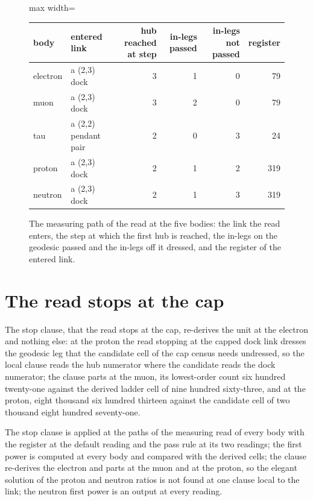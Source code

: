 \begin{figure}[h]\centering
\begin{adjustbox}{max width=\linewidth}\begin{tabular}{llrrrr}\toprule
body & entered link & hub reached at step & in-legs passed & in-legs not passed & register \\ \midrule
electron & a (2,3) dock & 3 & 1 & 0 & 79 \\
muon & a (2,3) dock & 3 & 2 & 0 & 79 \\
tau & a (2,2) pendant pair & 2 & 0 & 3 & 24 \\
proton & a (2,3) dock & 2 & 1 & 2 & 319 \\
neutron & a (2,3) dock & 2 & 1 & 3 & 319 \\ \bottomrule
\end{tabular}\end{adjustbox}
\caption{The measuring path of the read at the five bodies: the link the read enters, the step at which the first hub is reached, the in-legs on the geodesic passed and the in-legs off it dressed, and the register of the entered link.}
\end{figure}
\section{The read stops at the cap}\label{mod:I-3-D535866-w-rsac}
\begin{chwall}\label{box:I-3-D535866-w-rsac:1}
The stop clause, that the read stops at the cap, re-derives the unit at the electron and nothing else: at the proton the read stopping at the capped dock link dresses the geodesic leg that the candidate cell of the cap census needs undressed, so the local clause reads the hub numerator where the candidate reads the dock numerator; the clause parts at the muon, its lowest-order count six hundred twenty-one against the derived ladder cell of nine hundred sixty-three, and at the proton, eight thousand six hundred thirteen against the candidate cell of two thousand eight hundred seventy-one.
\end{chwall}
The stop clause is applied at the paths of the measuring read of every body with the register at the default reading and the pass rule at its two readings; the first power is computed at every body and compared with the derived cells; the clause re-derives the electron and parts at the muon and at the proton, so the elegant solution of the proton and neutron ratios is not found at one clause local to the link; the neutron first power is an output at every reading.

